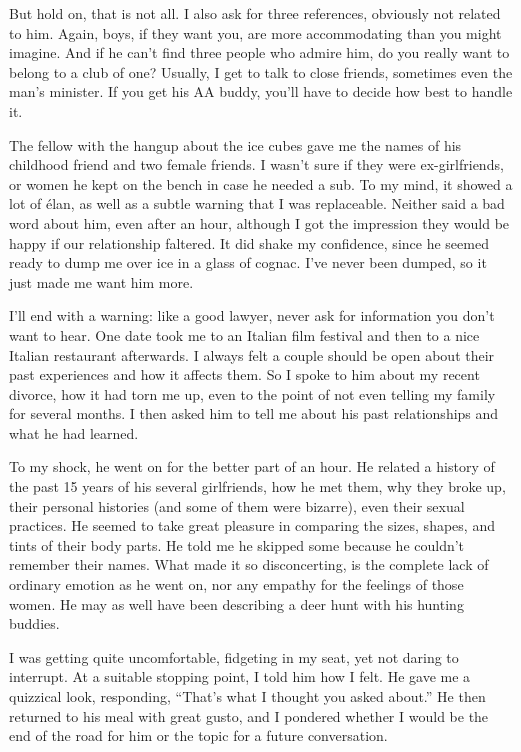 But hold on, that is not all. I also ask for three references, obviously not related to him. Again, boys, if they want you, are more accommodating than you might imagine. And if he can't find three people who admire him, do you really want to belong to a club of one? Usually, I get to talk to close friends, sometimes even the man's minister. If you get his AA buddy, you'll have to decide how best to handle it.

The fellow with the hangup about the ice cubes gave me the names of his childhood friend and two female friends. I wasn't sure if they were ex-girlfriends, or women he kept on the bench in case he needed a sub. To my mind, it showed a lot of élan, as well as a subtle warning that I was replaceable. Neither said a bad word about him, even after an hour, although I got the impression they would be happy if our relationship faltered. It did shake my confidence, since he seemed ready to dump me over ice in a glass of cognac. I've never been dumped, so it just made me want him more.

I'll end with a warning: like a good lawyer, never ask for information you don't want to hear. One date took me to an Italian film festival and then to a nice Italian restaurant afterwards. I always felt a couple should be open about their past experiences and how it affects them. So I spoke to him about my recent divorce, how it had torn me up, even to the point of not even telling my family for several months. I then asked him to tell me about his past relationships and what he had learned.

To my shock, he went on for the better part of an hour. He related a history of the past 15 years of his several girlfriends, how he met them, why they broke up, their personal histories (and some of them were bizarre), even their sexual practices. He seemed to take great pleasure in comparing the sizes, shapes, and tints of their body parts. He told me he skipped some because he couldn't remember their names. What made it so disconcerting, is the complete lack of ordinary emotion as he went on, nor any empathy for the feelings of those women. He may as well have been describing a deer hunt with his hunting buddies.

I was getting quite uncomfortable, fidgeting in my seat, yet not daring to interrupt. At a suitable stopping point, I told him how I felt. He gave me a quizzical look, responding, ``That's what I thought you asked about.'' He then returned to his meal with great gusto, and I pondered whether I would be the end of the road for him or the topic for a future conversation.



